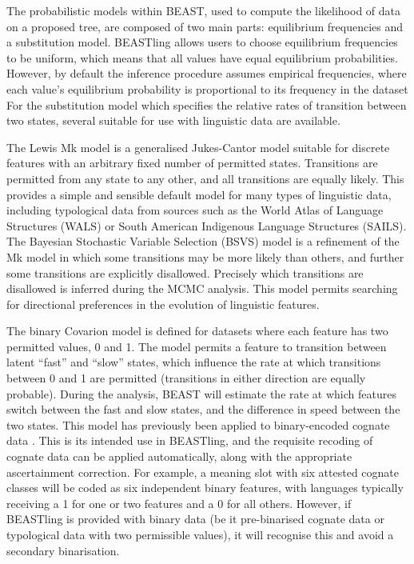 \documentclass[10pt,a4paper]{article}
\begin{document}
The probabilistic models within BEAST, used to compute the likelihood of data on a proposed tree, are composed of two main parts: equilibrium frequencies and a substitution model.  BEASTling allows users to choose equilibrium frequencies to be uniform, which means that all values have equal equilibrium probabilities. However, by default the inference procedure assumes empirical frequencies, where each value's equilibrium probability is proportional to its frequency in the dataset  For the substitution model which specifies the relative rates of transition between two states, several suitable for use with linguistic data are available.

The Lewis Mk model\cite{Lewis2001} is a generalised Jukes-Cantor model suitable for discrete features with an arbitrary fixed number of permitted states.  Transitions are permitted from any state to any other, and all transitions are equally likely.  This provides a simple and sensible default model for many types of linguistic data, including typological data from sources such as the World Atlas of Language Structures\cite{Dryer2013} (WALS) or South American Indigenous Language Structures\cite{Muysken2014} (SAILS).  The Bayesian Stochastic Variable Selection (BSVS) model is a refinement of the Mk model in which some transitions may be more likely than others, and further some transitions are explicitly disallowed.  Precisely which transitions are disallowed is inferred during the MCMC analysis.  This model permits searching for directional preferences in the evolution of linguistic features.

The binary Covarion model\cite{Penny2001} is defined for datasets where each feature has two permitted values, 0 and 1.  The model permits a feature to transition between latent ``fast'' and ``slow'' states, which influence the rate at which transitions between 0 and 1 are permitted (transitions in either direction are equally probable).  During the analysis, BEAST will estimate the rate at which features switch between the fast and slow states, and the difference in speed between the two states.  This model has previously been applied to binary-encoded cognate data \cite{Gray2009,Bouckaert2012}.  This is its intended use in BEASTling, and the requisite recoding of cognate data can be applied automatically, along with the appropriate ascertainment correction.  For example, a meaning slot with six attested cognate classes will be coded as six independent binary features, with languages typically receiving a 1 for one or two features and a 0 for all others.  However, if BEASTling is provided with binary data (be it pre-binarised cognate data or typological data with two permissible values), it will recognise this and avoid a secondary binarisation.
\end{document}
